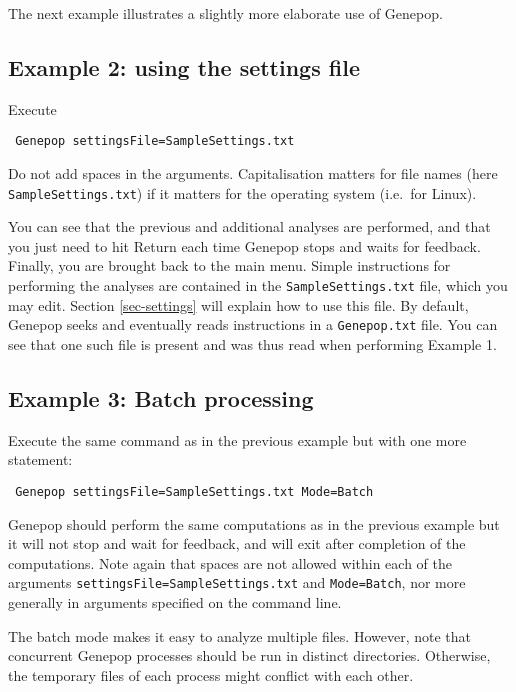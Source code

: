 \documentclass[12pt,]{book}
\begin{document}
The next example illustrates a slightly more elaborate use of Genepop.

\subsection{Example 2: using the settings
file}\label{example-2-using-the-settings-file}

Execute

\begin{verbatim}
 Genepop settingsFile=SampleSettings.txt
\end{verbatim}

Do not add spaces in the arguments.
Capitalisation matters for file names (here \texttt{SampleSettings.txt})
if it matters for the operating system (i.e.~for Linux).

You can see that the previous and additional analyses are performed, and
that you just need to hit Return each time Genepop stops and waits for
feedback. Finally, you are brought back to the main menu. Simple
instructions for performing the analyses are contained in the
\texttt{SampleSettings.txt} file, which you may edit. Section
\ref{sec-settings} will explain how to use this file. By default,
Genepop seeks and eventually reads instructions in a
\texttt{Genepop.txt} file. You can see that one such file is present and
was thus read when performing Example 1.

\subsection{Example 3: Batch
processing}\label{example-3-batch-processing}

Execute the same command as in the previous example but with one more
statement:

\begin{verbatim}
 Genepop settingsFile=SampleSettings.txt Mode=Batch
\end{verbatim}

 Genepop should perform the same
computations as in the previous example but it will not stop and wait
for feedback, and will exit after completion of the computations. Note
again that spaces are not allowed within each of the arguments
\texttt{settingsFile=SampleSettings.txt} and \texttt{Mode=Batch}, nor
more generally in arguments specified on the command line.

The batch mode makes it easy to analyze multiple files. However, note
that concurrent Genepop processes should be
run in distinct directories. Otherwise, the temporary files of each
process might conflict with each other.
\end{document}

